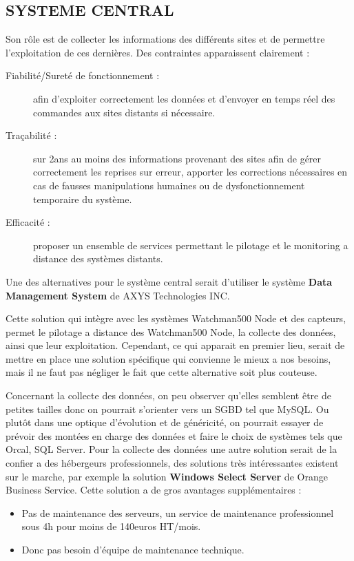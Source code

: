 \documentclass{article}
\begin{document}
\subsection{SYSTEME CENTRAL}
		Son rôle est de collecter les informations des différents sites et de permettre l'exploitation de ces dernières.
		Des contraintes apparaissent clairement : 
		\begin{description}
				\item[Fiabilité/Sureté de fonctionnement :] afin d'exploiter correctement les données et d'envoyer en temps réel des commandes aux sites distants si nécessaire.
				\item[Traçabilité :] sur 2ans au moins des informations provenant des sites afin de gérer correctement les reprises sur erreur, apporter les corrections nécessaires en cas de fausses manipulations humaines ou de dysfonctionnement temporaire du système.
				\item[Efficacité :] proposer un ensemble de services permettant le pilotage et le monitoring a distance des systèmes distants.
		\end{description}

		Une des alternatives pour le système central serait d'utiliser le système \textbf{Data Management System} de AXYS Technologies INC.


{Cette solution qui intègre avec les systèmes Watchman500 Node et des capteurs, permet le pilotage a distance des Watchman500 Node, la collecte des données, ainsi que leur exploitation.}
{}
{}
{}
{}
{Cependant, ce qui apparait en premier lieu, serait de mettre en place une solution spécifique qui convienne le mieux a nos besoins, mais il ne faut pas négliger le fait que cette alternative soit plus couteuse.}

		Concernant la collecte des données, on peu observer qu'elles semblent être de petites tailles donc on pourrait s'orienter vers un SGBD tel que MySQL. Ou plutôt dans une optique d'évolution et de généricité, on pourrait essayer de prévoir des montées en charge des données et faire le choix de systèmes tels que Orcal, SQL Server.
		Pour la collecte des données une autre solution serait de la confier a des hébergeurs professionnels, des solutions très intéressantes existent sur le marche, par exemple la solution \textbf{Windows Select Server} de Orange Business Service. Cette solution a de gros avantages supplémentaires :
		\begin{itemize}
				\item Pas de maintenance des serveurs, un service de maintenance professionnel sous 4h pour moins de 140euros HT/mois.
				\item Donc pas besoin d'équipe de maintenance technique.
		\end{itemize}
\end{document}
